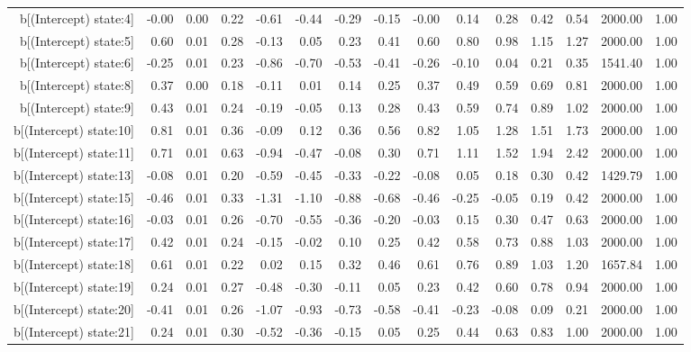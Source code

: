 \begin{table}[ht]
\begin{tabular}{rrrrrrrrrrrrrrr}
  b[(Intercept) state:4] & -0.00 & 0.00 & 0.22 & -0.61 & -0.44 & -0.29 & -0.15 & -0.00 & 0.14 & 0.28 & 0.42 & 0.54 & 2000.00 & 1.00 \\ 
  b[(Intercept) state:5] & 0.60 & 0.01 & 0.28 & -0.13 & 0.05 & 0.23 & 0.41 & 0.60 & 0.80 & 0.98 & 1.15 & 1.27 & 2000.00 & 1.00 \\ 
  b[(Intercept) state:6] & -0.25 & 0.01 & 0.23 & -0.86 & -0.70 & -0.53 & -0.41 & -0.26 & -0.10 & 0.04 & 0.21 & 0.35 & 1541.40 & 1.00 \\ 
  b[(Intercept) state:8] & 0.37 & 0.00 & 0.18 & -0.11 & 0.01 & 0.14 & 0.25 & 0.37 & 0.49 & 0.59 & 0.69 & 0.81 & 2000.00 & 1.00 \\ 
  b[(Intercept) state:9] & 0.43 & 0.01 & 0.24 & -0.19 & -0.05 & 0.13 & 0.28 & 0.43 & 0.59 & 0.74 & 0.89 & 1.02 & 2000.00 & 1.00 \\ 
  b[(Intercept) state:10] & 0.81 & 0.01 & 0.36 & -0.09 & 0.12 & 0.36 & 0.56 & 0.82 & 1.05 & 1.28 & 1.51 & 1.73 & 2000.00 & 1.00 \\ 
  b[(Intercept) state:11] & 0.71 & 0.01 & 0.63 & -0.94 & -0.47 & -0.08 & 0.30 & 0.71 & 1.11 & 1.52 & 1.94 & 2.42 & 2000.00 & 1.00 \\ 
  b[(Intercept) state:13] & -0.08 & 0.01 & 0.20 & -0.59 & -0.45 & -0.33 & -0.22 & -0.08 & 0.05 & 0.18 & 0.30 & 0.42 & 1429.79 & 1.00 \\ 
  b[(Intercept) state:15] & -0.46 & 0.01 & 0.33 & -1.31 & -1.10 & -0.88 & -0.68 & -0.46 & -0.25 & -0.05 & 0.19 & 0.42 & 2000.00 & 1.00 \\ 
  b[(Intercept) state:16] & -0.03 & 0.01 & 0.26 & -0.70 & -0.55 & -0.36 & -0.20 & -0.03 & 0.15 & 0.30 & 0.47 & 0.63 & 2000.00 & 1.00 \\ 
  b[(Intercept) state:17] & 0.42 & 0.01 & 0.24 & -0.15 & -0.02 & 0.10 & 0.25 & 0.42 & 0.58 & 0.73 & 0.88 & 1.03 & 2000.00 & 1.00 \\ 
  b[(Intercept) state:18] & 0.61 & 0.01 & 0.22 & 0.02 & 0.15 & 0.32 & 0.46 & 0.61 & 0.76 & 0.89 & 1.03 & 1.20 & 1657.84 & 1.00 \\ 
  b[(Intercept) state:19] & 0.24 & 0.01 & 0.27 & -0.48 & -0.30 & -0.11 & 0.05 & 0.23 & 0.42 & 0.60 & 0.78 & 0.94 & 2000.00 & 1.00 \\ 
  b[(Intercept) state:20] & -0.41 & 0.01 & 0.26 & -1.07 & -0.93 & -0.73 & -0.58 & -0.41 & -0.23 & -0.08 & 0.09 & 0.21 & 2000.00 & 1.00 \\ 
  b[(Intercept) state:21] & 0.24 & 0.01 & 0.30 & -0.52 & -0.36 & -0.15 & 0.05 & 0.25 & 0.44 & 0.63 & 0.83 & 1.00 & 2000.00 & 1.00 \\ 

\end{tabular}
\end{table}
